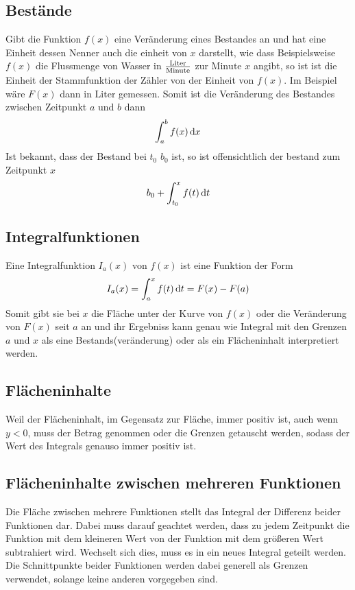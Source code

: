\documentclass{article}
\begin{document}
\subsection{Bestände} 
Gibt die Funktion $f(x)$ eine Veränderung eines Bestandes an und hat eine Einheit dessen Nenner auch die einheit von $x$ darstellt, wie dass Beispielsweise $f(x)$ die Flussmenge von Wasser in $\mathrm{Liter} \over \text{Minute}$ zur $\text{Minute } x$ angibt, so ist ist die Einheit der Stammfunktion der Zähler von der Einheit von $f(x)$. Im Beispiel wäre $F(x)$ dann in $\text{Liter}$ gemessen. Somit ist die Veränderung des Bestandes zwischen Zeitpunkt $a$ und $b$ dann
\[
 \int_a^b f(x) \,\mathrm{d}{x}
\]
Ist bekannt, dass der Bestand bei $t_0$ $b_0$ ist, so ist offensichtlich der bestand zum Zeitpunkt $x$
\[
 b_0 + \int_{t_0}^x f(t) \,\mathrm{d}{t}
\]
 
\subsection{Integralfunktionen} 
Eine Integralfunktion $I_a(x)$ von $f(x)$ ist eine Funktion der Form
\[
 I_a(x) = \int_a^x f(t) \,\mathrm{d}{t} = F(x) - F(a)
\]
Somit gibt sie bei $x$ die Fläche unter der Kurve von $f(x)$ oder die Veränderung von $F(x)$ seit $a$ an und ihr Ergebniss kann genau wie Integral mit den Grenzen $a$ und $x$ als eine Bestands(veränderung) oder als ein Flächeninhalt interpretiert werden.
 
\subsection{Flächeninhalte}
Weil der Flächeninhalt, im Gegensatz zur Fläche, immer positiv ist, auch wenn $y<0$, muss der Betrag genommen oder die Grenzen getauscht werden, sodass der Wert des Integrals genauso immer positiv ist. 
 
\subsection{Flächeninhalte zwischen mehreren Funktionen}
Die Fläche zwischen mehrere Funktionen stellt das Integral der Differenz beider Funktionen dar. Dabei muss darauf geachtet werden, dass zu jedem Zeitpunkt die Funktion mit dem kleineren Wert von der Funktion mit dem größeren Wert subtrahiert wird. Wechselt sich dies, muss es in ein neues Integral geteilt werden. Die Schnittpunkte beider Funktionen werden dabei generell als Grenzen verwendet, solange keine anderen vorgegeben sind. 
 
\end{document}
